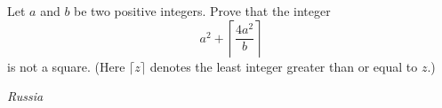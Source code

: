 Let $a$ and $b$ be two positive integers. Prove that the integer
\[a^2+\left\lceil\frac{4a^2}b\right\rceil\]is not a square. (Here $\lceil z\rceil$ denotes the least integer greater than or equal to $z$.)

\textit{Russia}
